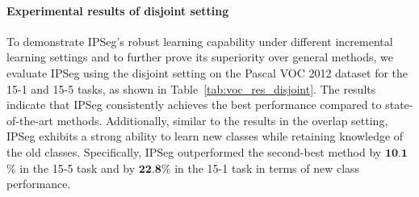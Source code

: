 \paragraph{Experimental results of disjoint setting}
To demonstrate IPSeg's robust learning capability under different incremental learning settings and to further prove its superiority over general methods, we evaluate IPSeg using the disjoint setting on the Pascal VOC 2012 dataset for the 15-1 and 15-5 tasks, as shown in Table~\ref{tab:voc_res_disjoint}. The results indicate that IPSeg consistently achieves the best performance compared to state-of-the-art methods. Additionally, similar to the results in the overlap setting, IPSeg exhibits a strong ability to learn new classes while retaining knowledge of the old classes. Specifically, IPSeg outperformed the second-best method by $\textbf{10.1}$\% in the 15-5 task and by $\textbf{22.8}$\% in the 15-1 task in terms of new class performance.

\begin{table}[h]
    \caption{Comparison with state-of-the-art methods on Pascal VOC 2012 dataset for disjoint setup.}
    \centering
    \label{tab:voc_res_disjoint}
\end{table}



